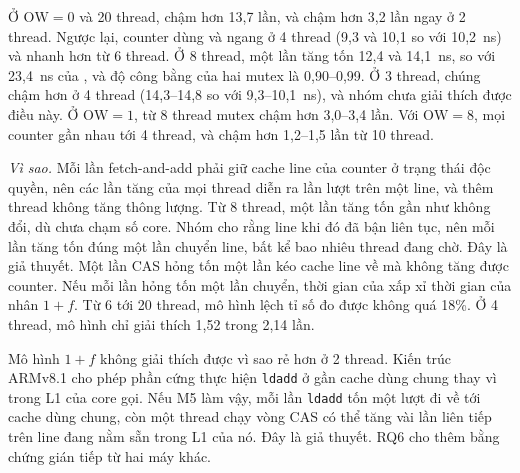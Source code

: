 
Ở $\mathrm{OW} = 0$ và 20 thread,  chậm hơn  13,7 lần, và
 chậm hơn  3,2 lần ngay ở 2 thread. Ngược lại, counter dùng
 và  ngang  ở 4 thread (9,3 và 10,1 so với
10,2~ns) và nhanh hơn từ 6 thread. Ở 8 thread, một lần tăng tốn 12,4 và 14,1~ns, so với 23,4~ns của , và độ công bằng của hai mutex là
0,90--0,99. Ở 3 thread, chúng chậm hơn ở 4 thread (14,3--14,8 so với 9,3--10,1~ns), và nhóm chưa giải
thích được điều này. Ở $\mathrm{OW} = 1$, từ 8 thread mutex chậm hơn  3,0--3,4 lần. Với
$\mathrm{OW} = 8$, mọi counter gần nhau tới 4 thread, và  chậm hơn  1,2--1,5 lần
từ 10 thread.

\emph{Vì sao.} Mỗi lần fetch-and-add phải giữ cache line của counter ở trạng thái độc quyền, nên các lần
tăng của mọi thread diễn ra lần lượt trên một line, và thêm thread không tăng thông lượng. Từ 8 thread,
một lần tăng tốn gần như không đổi, dù chưa chạm số core. Nhóm cho rằng line khi đó đã bận liên tục, nên
mỗi lần tăng tốn đúng một lần chuyển line, bất kể bao nhiêu thread đang chờ. Đây là giả thuyết. Một lần
CAS hỏng tốn một lần kéo cache line về mà không tăng được counter. Nếu mỗi lần hỏng tốn một lần chuyển, thời gian của  xấp xỉ
thời gian của  nhân $1+f$. Từ 6 tới 20 thread, mô hình lệch tỉ số đo được không quá 18\%. Ở 4
thread, mô hình chỉ giải thích 1,52 trong 2,14 lần.

Mô hình $1+f$ không giải thích được vì sao  rẻ hơn  ở 2 thread. Kiến trúc ARMv8.1
cho phép phần cứng thực hiện \texttt{ldadd} ở gần cache dùng chung thay vì trong L1 của core gọi. Nếu M5
làm vậy, mỗi lần \texttt{ldadd} tốn một lượt đi về tới cache dùng chung, còn một thread chạy vòng CAS có
thể tăng vài lần liên tiếp trên line đang nằm sẵn trong L1 của nó. Đây là giả thuyết. RQ6 cho thêm bằng
chứng gián tiếp từ hai máy khác.

